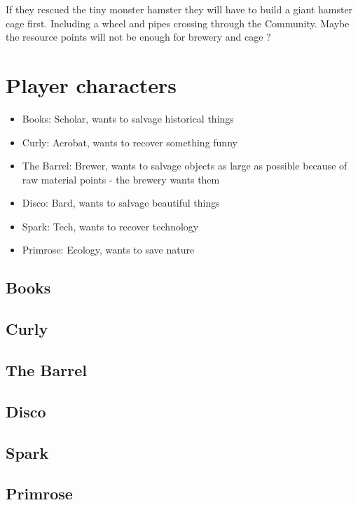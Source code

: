If they rescued the tiny monster hamster they will have to build a giant hamster cage first. Including a wheel and pipes crossing through the Community. Maybe the resource points will not be enough for brewery and cage ?

\section{Player characters}

\begin{itemize}
\item Books: Scholar, wants to salvage historical things
\item Curly: Acrobat, wants to recover something funny
\item The Barrel: Brewer, wants to salvage objects as large as possible because of raw material points - the brewery wants them
\item Disco: Bard, wants to salvage beautiful things
\item Spark: Tech, wants to recover technology
\item Primrose: Ecology, wants to save nature
\end{itemize}

\subsection{Books}
\subsection{Curly}
\subsection{The Barrel}
\subsection{Disco}
\subsection{Spark}
\subsection{Primrose}